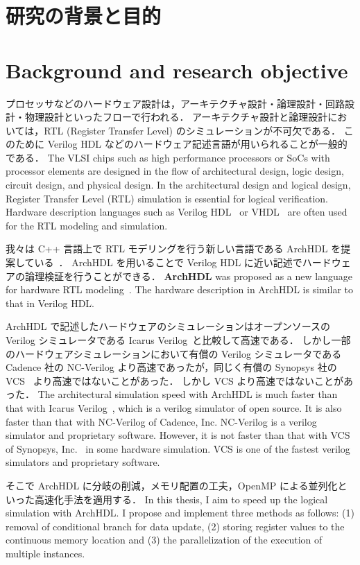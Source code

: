\section{研究の背景と目的}
\fi
\section{Background and research objective}

プロセッサなどのハードウェア設計は，アーキテクチャ設計・論理設計・回路設計・物理設計といったフローで行われる．
アーキテクチャ設計と論理設計においては，RTL (Register Transfer Level) のシミュレーションが不可欠である．
このために Verilog HDL などのハードウェア記述言語が用いられることが一般的である．
\fi
The VLSI chips such as high performance processors or SoCs with processor elements are designed in the flow of architectural design,
logic design, circuit design, and physical design.
In the architectural design and logical design, Register Transfer Level (RTL) simulation is essential for logical verification.
Hardware description languages such as Verilog HDL~\cite{standard:verilog} or VHDL~\cite{standard:vhdl} are often used for the RTL modeling and simulation.

我々は C++ 言語上で RTL モデリングを行う新しい言語である ArchHDL を提案している~\cite{satos:archhdl}．
ArchHDL を用いることで Verilog HDL に近い記述でハードウェアの論理検証を行うことができる．
\fi
\textbf{ArchHDL} was proposed as a new language for hardware RTL modeling~\cite{satos:archhdl}.
The hardware description in ArchHDL is similar to that in Verilog HDL.

ArchHDL で記述したハードウェアのシミュレーションはオープンソースの Verilog シミュレータである Icarus Verilog~\cite{iverilog}と比較して高速である．
しかし一部のハードウェアシミュレーションにおいて有償の Verilog シミュレータである Cadence 社の NC-Verilog より高速であったが，同じく有償の Synopsys 社の VCS~\cite{vcs} より高速ではないことがあった．
しかし VCS より高速ではないことがあった．
\fi
The architectural simulation speed with ArchHDL is much faster than
that with Icarus Verilog~\cite{iverilog}, which is a verilog simulator of open source.
It is also faster than that with NC-Verilog of Cadence, Inc.
NC-Verilog is a verilog simulator and proprietary software.
However, it is not faster than that with VCS of Synopsys, Inc.~\cite{vcs} in some hardware simulation.
VCS is one of the fastest verilog simulators and proprietary software.

そこで ArchHDL に分岐の削減，メモリ配置の工夫，OpenMP による並列化といった高速化手法を適用する．
\fi
In this thesis, I aim to speed up the logical simulation with ArchHDL.
I propose and implement three methods as follows:
(1) removal of conditional branch for data update,
(2) storing register values to the continuous memory location
and (3) the parallelization of the execution of multiple instances.

